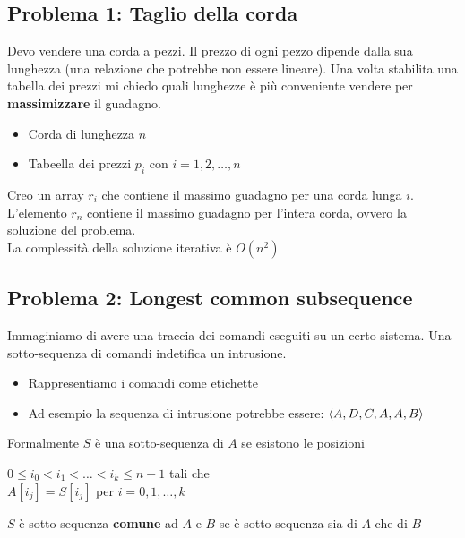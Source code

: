 \documentclass{article}
\begin{document}
\subsection{Problema 1: Taglio della corda}
Devo vendere una corda a pezzi. Il prezzo di ogni pezzo dipende dalla sua lunghezza (una relazione che potrebbe non essere lineare). Una volta stabilita una tabella dei prezzi mi chiedo quali lunghezze è più conveniente vendere per \textbf{massimizzare} il guadagno.
\begin{itemize}
  \item Corda di lunghezza \(n\)
  \item Tabeella dei prezzi \(p_i\) con \(i = 1,2,\ldots,n\)
\end{itemize}
Creo un array \(r_i\) che contiene il massimo guadagno per una corda lunga \(i\). L'elemento \(r_n\) contiene il massimo guadagno per l'intera corda, ovvero la soluzione del problema.  \\
La complessità della soluzione iterativa è \(O(n^2)\)

\subsection{Problema 2: Longest common subsequence}
Immaginiamo di avere una traccia dei comandi eseguiti su un certo sistema. Una sotto-sequenza di comandi indetifica un intrusione.
\begin{itemize}
  \item Rappresentiamo i comandi come etichette
  \item Ad esempio la sequenza di intrusione potrebbe essere: \(\langle A,D,C,A,A,B \rangle\)
\end{itemize}
Formalmente \(S\) è una sotto-sequenza di \(A\) se esistono le posizioni
\begin{center}
  \(0 \leq i_0 < i_1 < \ldots < i_k \leq n - 1\) tali che \\
  \(A[i_j] = S[i_j]\) per \(i = 0, 1, \ldots, k\)
\end{center}
\(S\) è sotto-sequenza \textbf{comune} ad \(A\) e \(B\) se è sotto-sequenza sia di \(A\) che di \(B\)
\end{document}
